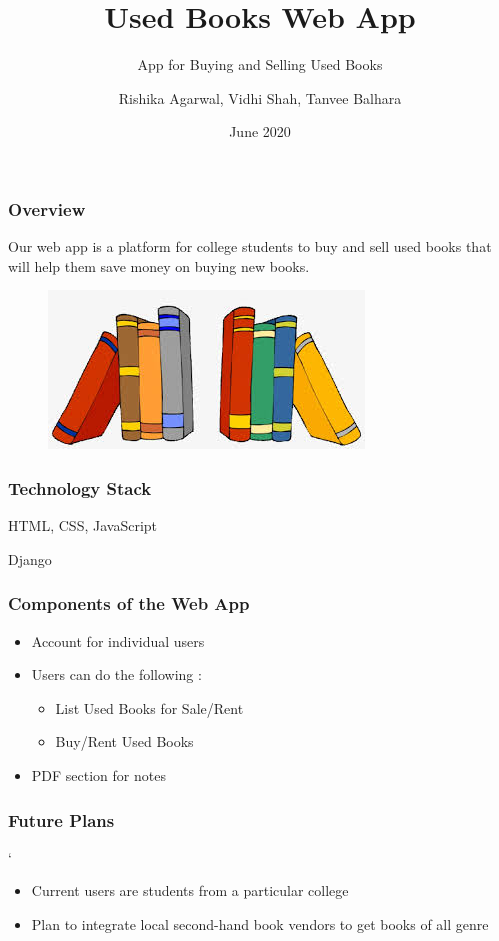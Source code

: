 \documentclass[14pt]{beamer}
\title[USED BOOKS]{Used Books Web App}
\subtitle{App for Buying and Selling Used Books}
\author[Team 14]{Rishika Agarwal, Vidhi Shah, Tanvee Balhara}
\date{June 2020}
\begin{document}
\begin{frame}
    \titlepage
\end{frame}

\begin{frame}
    \frametitle{Overview}
    Our web app is a platform for college students to buy and sell used books that will help them save money on buying new books.
    \begin{figure}
        \includegraphics[scale=0.5]{books.jpg}
        \end{figure}
    \end{frame}

\begin{frame}
    \frametitle{Technology Stack}
    \begin{description}
        \item<1-> [Front-end] HTML, CSS, JavaScript
        \item<2-> [Back-end] Django
    \end{description}
\end{frame}

\begin{frame}
    \frametitle{Components of the Web App}
    \begin{itemize}
        \item<1->  Account for individual users
        \item<2->  Users can do the following :
            \begin{itemize}
                \item<3->  List Used Books for Sale/Rent
                \item<4->  Buy/Rent Used Books
            \end{itemize}
        \item<5->  PDF section for notes
    \end{itemize}
\end{frame}

\begin{frame}
    \frametitle{Future Plans}
`   \begin{itemize}
        \item<1-> Current users are students from a particular college
        \item<2-> Plan to integrate local second-hand book vendors to get books of all genre
    \end{itemize}
\end{frame}
\end{document}
